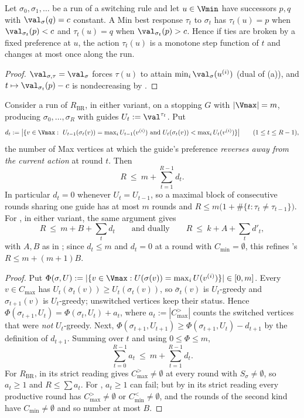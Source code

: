 \begin{lemma}\label{bsc:minrev}
Let $\sigma_0,\sigma_1,\dots$ be a run of a switching rule and let
$u\in\Vmin$ have successors $p,q$ with $\val_\sigma(q)=c$ constant.  A Min
best response $\tau_t$ to $\sigma_t$ has $\tau_t(u)=p$ when
$\val_{\sigma_t}(p)<c$ and $\tau_t(u)=q$ when $\val_{\sigma_t}(p)>c$.  Hence
if ties are broken by a fixed preference at $u$, the action $\tau_t(u)$ is a
monotone step function of $t$ and changes at most once along the run.
\end{lemma}

\begin{proof}
$\val_{\sigma,\tau}=\val_\sigma$ forces $\tau(u)$ to attain
$\min_i\val_\sigma(u^{(i)})$ (dual of (a)), and
$t\mapsto\val_{\sigma_t}(p)-c$ is nondecreasing by .
\end{proof}

\begin{theorem}\label{bsc:reorder}
Consider a run of $R_{\mathrm{BR}}$, in either variant, on a stopping $G$ with
$|\Vmax|=m$, producing $\sigma_0,\dots,\sigma_R$ with guides
$U_t:=\val^{\tau_t}$.  Put
\[
  d_t:=\bigl|\{v\in\Vmax:\ U_{t-1}(\sigma_t(v))=\textstyle\max_iU_{t-1}(v^{(i)})
   \ \text{and}\ U_t(\sigma_t(v))<\max_iU_t(v^{(i)})\}\bigr|\qquad(1\le t\le R-1),
\]
the number of Max vertices at which the guide's preference \emph{reverses away
from the current action} at round $t$.  Then
\[
  R\ \le\ m+\sum_{t=1}^{R-1}d_t .
\]
In particular $d_t=0$ whenever $U_t=U_{t-1}$, so a maximal block of
consecutive rounds sharing one guide has at most $m$ rounds and
$R\le m\bigl(1+\#\{t:\tau_t\ne\tau_{t-1}\}\bigr)$.  For , in
either variant, the same argument gives
\[
  R\ \le\ m+B+\sum_{t}d_t\qquad\text{and dually}\qquad R\ \le\ k+A+\sum_{t}d'_t,
\]
with $A,B$ as in ; since $d_t\le m$ and $d_t=0$ at a
round with $C_{\min}=\emptyset$, this refines 's
$R\le m+(m+1)B$.
\end{theorem}

\begin{proof}
Put $\Phi(\sigma,U):=|\{v\in\Vmax: U(\sigma(v))=\max_iU(v^{(i)})\}|\in[0,m]$.
Every $v\in C_{\max}$ has $U_t(\bar\sigma_t(v))\ge U_t(\sigma_t(v))$, so
$\bar\sigma_t(v)$ is $U_t$-greedy and $\sigma_{t+1}(v)$ is $U_t$-greedy;
unswitched vertices keep their status.  Hence
$\Phi(\sigma_{t+1},U_t)=\Phi(\sigma_t,U_t)+a_t$, where $a_t:=|C^{>}_{\max}|$
counts the switched vertices that were \emph{not} $U_t$-greedy.  Next,
$\Phi(\sigma_{t+1},U_{t+1})\ge\Phi(\sigma_{t+1},U_t)-d_{t+1}$ by the
definition of $d_{t+1}$.  Summing over $t$ and using $0\le\Phi\le m$,
\[
  \sum_{t=0}^{R-1}a_t\ \le\ m+\sum_{t=1}^{R-1}d_t .
\]
For $R_{\mathrm{BR}}$,  in its strict reading gives
$C^{>}_{\max}\ne\emptyset$ at every round with $S_\sigma\ne\emptyset$, so
$a_t\ge1$ and $R\le\sum a_t$.  For , $a_t\ge1$ can fail; but by
 in its strict reading every productive round has
$C^{>}_{\max}\ne\emptyset$ or $C^{<}_{\min}\ne\emptyset$, and the rounds of
the second kind have $C_{\min}\ne\emptyset$ and so number at most $B$.
\end{proof}

